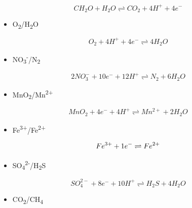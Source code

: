 \documentclass[]{book}
\providecommand{\tightlist}{%
  \setlength{\itemsep}{0pt}\setlength{\parskip}{0pt}}
\theoremstyle{definition}
\theoremstyle{definition}
\theoremstyle{definition}
\theoremstyle{remark}
\begin{document}
\begin{equation}
CH_2O + H_2O \rightleftharpoons CO_2 + 4 H^+ + 4 e^-
\end{equation}

\begin{itemize}
\tightlist
\item
  O\textsubscript{2}/H\textsubscript{2}O
\end{itemize}

\begin{equation}
O_2 + 4 H^+ + 4 e^- \rightleftharpoons 4H_2O  
\end{equation}

\begin{itemize}
\tightlist
\item
  NO\textsubscript{3}\textsuperscript{-}/N\textsubscript{2}
\end{itemize}

\begin{equation}
2 NO_3^- + 10 e^- + 12 H^+ \rightleftharpoons N_2 + 6 H_2O
\end{equation}

\begin{itemize}
\tightlist
\item
  MnO\textsubscript{2}/Mn\textsuperscript{2+}
\end{itemize}

\begin{equation}
MnO_2 + 4 e^- + 4 H^+ \rightleftharpoons Mn^{2+} + 2 H_2O
\end{equation}

\begin{itemize}
\tightlist
\item
  Fe\textsuperscript{3+}/Fe\textsuperscript{2+}
\end{itemize}

\begin{equation}
Fe^{3+} + 1 e^- \rightleftharpoons Fe^{2+} \\
\end{equation}

\begin{itemize}
\tightlist
\item
  SO\textsubscript{4}\textsuperscript{2-}/H\textsubscript{2}S
\end{itemize}

\begin{equation}
SO_4^{2-} + 8 e^- + 10 H^+  \rightleftharpoons H_2S + 4 H_2O
\end{equation}

\begin{itemize}
\tightlist
\item
  CO\textsubscript{2}/CH\textsubscript{4}
\end{itemize}
\end{document}
